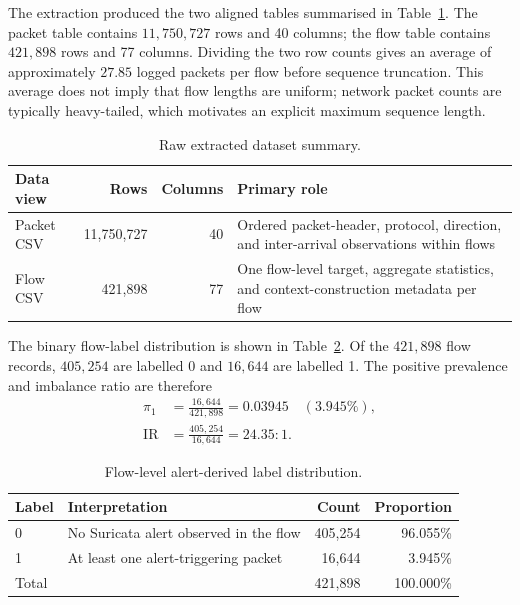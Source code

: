 \documentclass[11pt,fleqn]{report}
\begin{document}
The extraction produced the two aligned tables summarised in Table~\ref{tab:raw_dataset_summary}. The packet table contains $11{,}750{,}727$ rows and 40 columns; the flow table contains $421{,}898$ rows and 77 columns. Dividing the two row counts gives an average of approximately $27.85$ logged packets per flow before sequence truncation. This average does not imply that flow lengths are uniform; network packet counts are typically heavy-tailed, which motivates an explicit maximum sequence length.

\begin{table}[H]
    \centering
    \caption{Raw extracted dataset summary.}
    \label{tab:raw_dataset_summary}
    \begin{tabular}{@{}lrrp{5.7cm}@{}}
        \toprule
        Data view & Rows & Columns & Primary role \\
        \midrule
        Packet CSV & 11,750,727 & 40 & Ordered packet-header, protocol, direction, and inter-arrival observations within flows \\
        Flow CSV & 421,898 & 77 & One flow-level target, aggregate statistics, and context-construction metadata per flow \\
        \bottomrule
    \end{tabular}
\end{table}

The binary flow-label distribution is shown in Table~\ref{tab:flow_label_distribution}. Of the $421{,}898$ flow records, $405{,}254$ are labelled 0 and $16{,}644$ are labelled 1. The positive prevalence and imbalance ratio are therefore
\begin{align}
    \pi_1 &= \frac{16{,}644}{421{,}898} = 0.03945
             \quad (3.945\%), \\
    \mathrm{IR} &= \frac{405{,}254}{16{,}644} = 24.35:1.
    \label{eq:dataset_imbalance}
\end{align}

\begin{table}[H]
    \centering
    \caption{Flow-level alert-derived label distribution.}
    \label{tab:flow_label_distribution}
    \begin{tabular}{@{}llrr@{}}
        \toprule
        Label & Interpretation & Count & Proportion \\
        \midrule
        0 & No Suricata alert observed in the flow & 405,254 & 96.055\% \\
        1 & At least one alert-triggering packet & 16,644 & 3.945\% \\
        \midrule
        Total & & 421,898 & 100.000\% \\
        \bottomrule
    \end{tabular}
\end{table}
\end{document}
